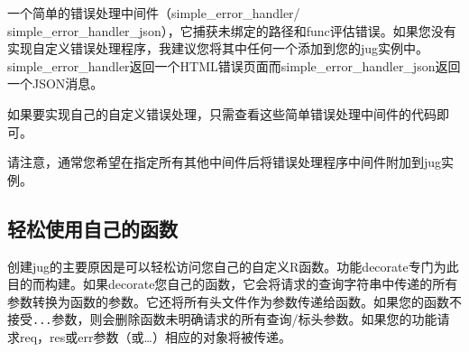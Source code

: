 \documentclass[]{book}
\newenvironment{Shaded}{\begin{snugshade}}{\end{snugshade}}
\newcommand{\KeywordTok}[1]{\textcolor[rgb]{0.13,0.29,0.53}{\textbf{#1}}}
\newcommand{\DecValTok}[1]{\textcolor[rgb]{0.00,0.00,0.81}{#1}}
\newcommand{\FloatTok}[1]{\textcolor[rgb]{0.00,0.00,0.81}{#1}}
\newcommand{\StringTok}[1]{\textcolor[rgb]{0.31,0.60,0.02}{#1}}
\newcommand{\OperatorTok}[1]{\textcolor[rgb]{0.81,0.36,0.00}{\textbf{#1}}}
\newcommand{\ErrorTok}[1]{\textcolor[rgb]{0.64,0.00,0.00}{\textbf{#1}}}
\newcommand{\NormalTok}[1]{#1}
\begin{document}
一个简单的错误处理中间件（simple\_error\_handler/
simple\_error\_handler\_json），它捕获未绑定的路径和func评估错误。如果您没有实现自定义错误处理程序，我建议您将其中任何一个添加到您的jug实例中。simple\_error\_handler返回一个HTML错误页面而simple\_error\_handler\_json返回一个JSON消息。

\begin{Shaded}
\end{Shaded}

\begin{Shaded}
\end{Shaded}

如果要实现自己的自定义错误处理，只需查看这些简单错误处理中间件的代码即可。

请注意，通常您希望在指定所有其他中间件后将错误处理程序中间件附加到jug实例。

\subsection{轻松使用自己的函数}

创建jug的主要原因是可以轻松访问您自己的自定义R函数。功能decorate专门为此目的而构建。如果decorate您自己的函数，它会将请求的查询字符串中传递的所有参数转换为函数的参数。它还将所有头文件作为参数传递给函数。如果您的函数不接受\texttt{...}参数，则会删除函数未明确请求的所有查询/标头参数。如果您的功能请求req，res或err参数（或\ldots{}）相应的对象将被传递。
\end{document}
